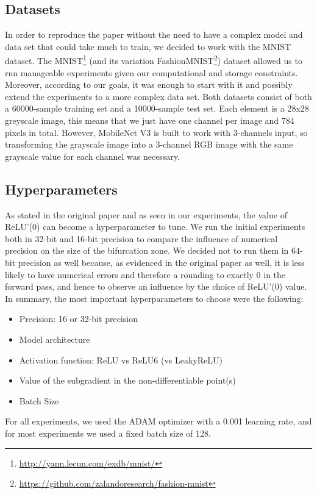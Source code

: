 \subsection{Datasets}
In order to reproduce the paper without the need to have a complex model and data set that could take much to train, we decided to work with the MNIST dataset. The MNIST\footnote{\url{http://yann.lecun.com/exdb/mnist/}} (and its variation FashionMNIST\footnote{\url{https://github.com/zalandoresearch/fashion-mnist}}) dataset allowed us to run manageable experiments given our computational and storage constraints. Moreover, according to our goals, it was enough to start with it and possibly extend the experiments to a more complex data set. Both datasets consist of both a 60000-sample training set and a 10000-sample test set. Each element is a 28x28 greyscale image, this means that we just have one channel per image and 784 pixels in total. However, MobileNet V3 is built to work with 3-channels input, so transforming the grayscale image into a 3-channel RGB image with the same grayscale value for each channel was necessary.

\subsection{Hyperparameters}
As stated in the original paper and as seen in our experiments, the value of ReLU'(0) can become a hyperparameter to tune. We run the initial experiments both in 32-bit and 16-bit precision to compare the influence of numerical precision on the size of the bifurcation zone. We decided not to run them in 64-bit precision as well because, as evidenced in the original paper as well, it is less likely to have numerical errors and therefore a rounding to exactly 0 in the forward pass, and hence to observe an influence by the choice of ReLU'(0) value. In summary, the most important hyperparameters to choose were the following:
\begin{itemize}
\item Precision: 16 or 32-bit precision 
\item Model architecture
\item Activation function: ReLU vs ReLU6 (vs LeakyReLU)
\item Value of the subgradient in the non-differentiable point(s)
\item Batch Size
\end{itemize}

For all experiments, we used the ADAM optimizer with a 0.001 learning rate, and for most experiments we used a fixed batch size of 128. 

